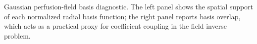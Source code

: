 \caption{Gaussian perfusion-field basis diagnostic. The left panel shows the spatial support of each normalized radial basis function; the right panel reports basis overlap, which acts as a practical proxy for coefficient coupling in the field inverse problem.}\label{fig:field-basis-coverage}
